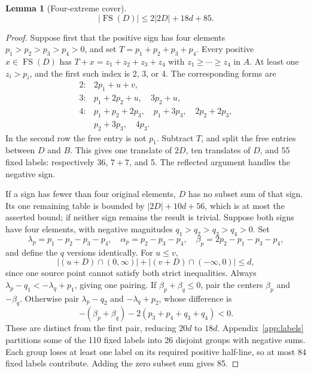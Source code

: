 \documentclass[11pt,a4paper]{article}
\newtheorem{lemma}[theorem]{Lemma}
\theoremstyle{remark}\newtheorem{remark}[theorem]{Remark}
\newcommand{\FS}{\operatorname{FS}}
\begin{document}
\begin{lemma}[Four-extreme cover]\label{lem:extreme}
\[|\FS(D)|\le2|2D|+18d+85.\]
\end{lemma}
\begin{proof}
Suppose first that the positive sign has four elements $p_1>p_2>p_3>p_4>0$, and set $T=p_1+p_2+p_3+p_4$. Every positive $x\in\FS(D)$ has $T+x=z_1+z_2+z_3+z_4$ with $z_1\ge\cdots\ge z_4$ in $A$. At least one $z_i>p_i$, and the first such index is 2, 3, or 4. The corresponding forms are
\[
\begin{array}{ll}
2:&2p_1+u+v,\\
3:&p_1+2p_2+u,\quad3p_2+u,\\
4:&p_1+p_2+2p_3,\quad p_1+3p_3,\quad2p_2+2p_3,\\
 &p_2+3p_3,\quad4p_3.
\end{array}
\]
In the second row the free entry is not $p_1$. Subtract $T$, and split the free entries between $D$ and $B$. This gives one translate of $2D$, ten translates of $D$, and 55 fixed labels: respectively $36$, $7+7$, and 5. The reflected argument handles the negative sign.

If a sign has fewer than four original elements, $D$ has no subset sum of that sign. Its one remaining table is bounded by $|2D|+10d+56$, which is at most the asserted bound; if neither sign remains the result is trivial. Suppose both signs have four elements, with negative magnitudes $q_1>q_2>q_3>q_4>0$.
Set
\[\lambda_p=p_1-p_2-p_3-p_4,\quad\alpha_p=p_2-p_3-p_4,\quad
\beta_p=2p_2-p_1-p_3-p_4,\]
and define the $q$ versions identically. For $u\le v$,
\[|(u+D)\cap(0,\infty)|+|(v+D)\cap(-\infty,0)|\le d,\]
since one source point cannot satisfy both strict inequalities. Always $\lambda_p-q_1<-\lambda_q+p_1$, giving one pairing. If $\beta_p+\beta_q\le0$, pair the centers $\beta_p$ and $-\beta_q$. Otherwise pair $\lambda_p-q_2$ and $-\lambda_q+p_2$, whose difference is
\[-(\beta_p+\beta_q)-2(p_3+p_4+q_3+q_4)<0.\]
These are distinct from the first pair, reducing $20d$ to $18d$. Appendix~\ref{app:labels} partitions some of the 110 fixed labels into 26 disjoint groups with negative sums. Each group loses at least one label on its required positive half-line, so at most 84 fixed labels contribute. Adding the zero subset sum gives 85.
\end{proof}
\end{document}
